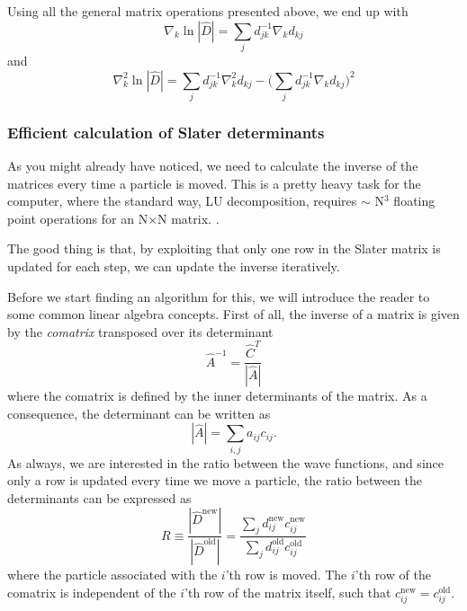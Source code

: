 Using all the general matrix operations presented above, we end up with
\begin{equation*}
\nabla_k\ln|\hat{D}|=\sum_{j}d_{jk}^{-1}\nabla_kd_{kj}
\end{equation*}
and
\begin{equation*}
\nabla_k^2\ln|\hat{D}|=\sum_jd_{jk}^{-1}\nabla_k^2d_{kj}-\Big(\sum_jd_{jk}^{-1}\nabla_kd_{kj}\Big)^2
\end{equation*}

\subsubsection{Efficient calculation of Slater determinants}
As you might already have noticed, we need to calculate the inverse of the matrices every time a particle is moved. This is a pretty heavy task for the computer, where the standard way, LU decomposition, requires $\sim$ N$^3$ floating point operations for an N$\times$N matrix. \cite{trahan_computational_2006}. 

The good thing is that, by exploiting that only one row in the Slater matrix is updated for each step, we can update the inverse iteratively. 

Before we start finding an algorithm for this, we will introduce the reader to some common linear algebra concepts. First of all, the inverse of a matrix is given by the \textit{comatrix} transposed over its determinant
\begin{equation}
\hat{A}^{-1}=\frac{\hat{C}^T}{|\hat{A}|}
\end{equation}
where the comatrix is defined by the inner determinants of the matrix. \cite{weisstein_matrix_nodate} As a consequence, the determinant can be written as 
\begin{equation}
|\hat{A}|=\sum_{i,j}a_{ij}c_{ij}.
\end{equation}
As always, we are interested in the ratio between the wave functions, and since only a row is updated every time we move a particle, the ratio between the determinants can be expressed as
\begin{equation}
R\equiv \frac{|\hat{D}^{\text{new}}|}{|\hat{D}^{\text{old}}|}=\frac{\sum_{j}d_{ij}^{\text{new}}c_{ij}^{\text{new}}}{\sum_{j}d_{ij}^{\text{old}}c_{ij}^{\text{old}}}
\end{equation}
where the particle associated with the $i$'th row is moved. The $i$'th row of the comatrix is independent of the $i$'th row of the matrix itself, such that $c_{ij}^{\text{new}}=c_{ij}^{\text{old}}$. 


